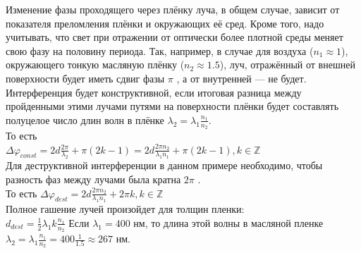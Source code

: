 \documentclass[__main__.tex]{subfiles}
\begin{document}
Изменение фазы проходящего через плёнку луча, в общем случае, зависит от показателя преломления плёнки и окружающих её сред. Кроме того, надо учитывать, что свет при отражении от оптически более плотной среды меняет свою фазу на половину периода. Так, например, в случае для воздуха ($n_1 ≈ 1$), окружающего тонкую масляную плёнку ($n_2 ≈ 1.5$), луч, отражённый от внешней поверхности будет иметь сдвиг фазы $\pi$ , а от внутренней — не будет. Интерференция будет конструктивной, если итоговая разница между пройденными этими лучами путями на поверхности плёнки будет составлять полуцелое число длин волн в плёнке $\lambda_2 = \lambda_1\frac{n_1}{n_2}$.\\
То есть\\
${\displaystyle \Delta \varphi _{const}=2d{\frac {2\pi }{\lambda _{2}}}+\pi (2k-1)=2d{\frac {2\pi n_{2}}{\lambda _{1}n_{1}}}+\pi (2k-1),k\in \mathbb {Z} }$\\ 
Для деструктивной интерференции в данном примере необходимо, чтобы разность фаз между лучами была кратна $2\pi$ .\\
То есть ${\displaystyle \Delta \varphi _{dest}=2d{\frac {2\pi n_{2}}{\lambda _{1}n_{1}}}+2\pi k,k\in \mathbb {Z} }$ \\
Полное гашение лучей произойдет для толщин пленки:\\
${\displaystyle d_{dest}={\frac {1}{2}}\lambda _{1}k{\frac {n_{1}}{n_{2}}}}$ 
Если ${\displaystyle \lambda _{1}=400}$ нм, то длина этой волны в масляной пленке ${\displaystyle \lambda _{2}=\lambda _{1}{\frac {n_{1}}{n_{2}}}=400{\frac {1}{1.5}}\approx 267}$ нм.
\end{document}
